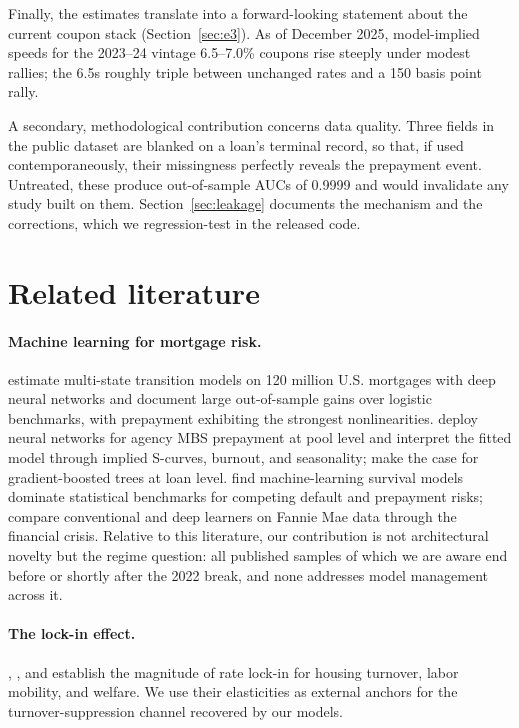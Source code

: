 \documentclass[11pt]{article}
\begin{document}
Finally, the estimates translate into a forward-looking statement about the current coupon
stack (Section~\ref{sec:e3}). As of December 2025, model-implied speeds for the 2023--24
vintage 6.5--7.0\% coupons rise steeply under modest rallies; the 6.5s roughly triple between
unchanged rates and a 150 basis point rally.

A secondary, methodological contribution concerns data quality. Three fields in the public
dataset are blanked on a loan's terminal record, so that, if used contemporaneously, their
missingness perfectly reveals the prepayment event. Untreated, these produce out-of-sample AUCs
of 0.9999 and would invalidate any study built on them. Section~\ref{sec:leakage} documents the
mechanism and the corrections, which we regression-test in the released code.

\section{Related literature}
\label{sec:lit}

\paragraph{Machine learning for mortgage risk.} \citet{sadhwani2021deep} estimate multi-state
transition models on 120 million U.S. mortgages with deep neural networks and document large
out-of-sample gains over logistic benchmarks, with prepayment exhibiting the strongest
nonlinearities. \citet{zhang2019agency} deploy neural networks for agency MBS prepayment at pool
level and interpret the fitted model through implied S-curves, burnout, and seasonality;
\citet{schultz2021rise} make the case for gradient-boosted trees at loan level.
\citet{blumenstock2022deep} find machine-learning survival models dominate statistical benchmarks
for competing default and prepayment risks; \citet{ojha2021comparing} compare conventional and
deep learners on Fannie Mae data through the financial crisis. Relative to this literature, our
contribution is not architectural novelty but the regime question: all published samples of which
we are aware end before or shortly after the 2022 break, and none addresses model management
across it.

\paragraph{The lock-in effect.} \citet{batzer2024lockin}, \citet{fonseca2024lockin}, and
\citet{liebersohn2025mobility} establish the magnitude of rate lock-in for housing turnover,
labor mobility, and welfare. We use their elasticities as external anchors for the
turnover-suppression channel recovered by our models.
\end{document}
